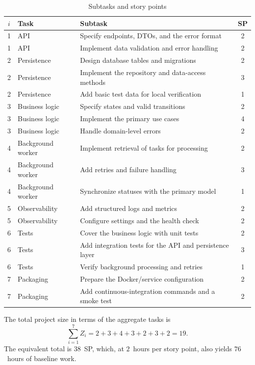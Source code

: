 \begin{table}[ht!]
\centering
\caption{Subtasks and story points}
\label{tab:practical-subtasks}
\begin{tabularx}{\textwidth}{@{}c>{\raggedright\arraybackslash}p{}>{\raggedright\arraybackslash}Xc@{}}
\toprule
$i$ & Task & Subtask & SP \\
\midrule
1 & API & Specify endpoints, DTOs, and the error format & 2 \\
1 & API & Implement data validation and error handling & 2 \\
2 & Persistence & Design database tables and migrations & 2 \\
2 & Persistence & Implement the repository and data-access methods & 3 \\
2 & Persistence & Add basic test data for local verification & 1 \\
3 & Business logic & Specify states and valid transitions & 2 \\
3 & Business logic & Implement the primary use cases & 4 \\
3 & Business logic & Handle domain-level errors & 2 \\
4 & Background worker & Implement retrieval of tasks for processing & 2 \\
4 & Background worker & Add retries and failure handling & 3 \\
4 & Background worker & Synchronize statuses with the primary model & 1 \\
5 & Observability & Add structured logs and metrics & 2 \\
5 & Observability & Configure settings and the health check & 2 \\
6 & Tests & Cover the business logic with unit tests & 2 \\
6 & Tests & Add integration tests for the API and persistence layer & 3 \\
6 & Tests & Verify background processing and retries & 1 \\
7 & Packaging & Prepare the Docker/service configuration & 2 \\
7 & Packaging & Add continuous-integration commands and a smoke test & 2 \\
\bottomrule
\end{tabularx}
\end{table}

The total project size in terms of the aggregate tasks is
\[
  \sum_{i=1}^{7} Z_i = 2 + 3 + 4 + 3 + 2 + 3 + 2 = 19.
\]
The equivalent total is $38$~SP, which, at $2$~hours per story point, also
yields $76$~hours of baseline work.

